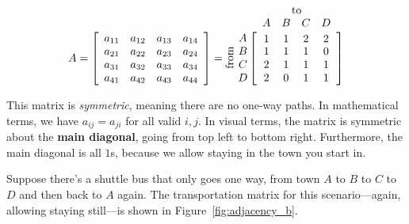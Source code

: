 \documentclass[../gatm.tex]{subfiles}
\begin{document}
$$
  A = \left[\begin{array}{cccc}
  a_{11} & a_{12} & a_{13} & a_{14} \\
a_{21} & a_{22} & a_{23} & a_{24} \\
a_{31} & a_{32} & a_{33} & a_{34} \\
a_{41} & a_{42} & a_{43} & a_{44} \\
  \end{array}\right] =
  \rotatebox[origin=c]{90}{from}\;\,
  \begin{array}{@{}c@{}}
    \rowind{A} \\ \rowind{B} \\ \rowind{C} \\ \rowind{D}
  \end{array}
  \mathop{\left[
  \begin{array}{cccc}
     \colind{1}{A}  &  \colind{1}{B}  &  \colind{2}{C}  & \colind{2}{D} \\
1 & 1 & 1 & 0 \\
2 & 1 & 1 & 1 \\
2 & 0 & 1 & 1 \\
  \end{array}
  \right]}^{
  \begin{array}{@{}c@{}}
    \rowind{\text{to}} \\ \mathstrut
  \end{array}
  }
$$

This matrix is \textit{symmetric}, meaning there are no one-way paths. In mathematical terms, we have $a_{ij}=a_{ji}$ for all valid $i,j$. In visual terms, the matrix is symmetric about the \textbf{main diagonal}, going from top left to bottom right. Furthermore, the main diagonal is all $1$s, because we allow staying in the town you start in.

Suppose there's a shuttle bus that only goes one way, from town $A$ to $B$ to $C$ to $D$ and then back to $A$ again. The transportation matrix for this scenario---again, allowing staying still---is shown in Figure~\ref{fig:adjacency_b}.
\end{document}
